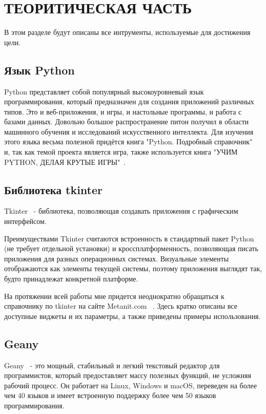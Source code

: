 \chapter{\label{ch:ch01}ТЕОРИТИЧЕСКАЯ ЧАСТЬ}


В этом разделе будут описаны все интрументы, используемые для достижения цели.

\section{\label{sec:ch01/sec01}Язык Python}
Python представляет собой популярный высокоуровневый язык программирования, который предназначен для создания приложений различных типов. Это и веб-приложения, и игры, и настольные программы, и работа с базами данных. Довольно большое распространение питон получил в области машинного обучения и исследований искусственного интеллекта.
Для изучения этого языка весьма полезной придётся книга "Python. Подробный справочник"~\cite{book-Python} и, так как темой проекта является игра, также используется книга "УЧИМ PYTHON, ДЕЛАЯ КРУТЫЕ ИГРЫ"~\cite{book-Python_2}.


\section{\label{sec:ch01/sec02}Библиотека tkinter}
Tkinter~\cite{Python-tkinter} - библиотека, позволяющая создавать приложения с графическим интерфейсом.

Преимуществами Tkinter считаются встроенность в стандартный пакет Python (не требует отдельной установки) и кроссплатформенность, позволяющая писать приложения для разных операционных системах. Визуальные элементы отображаются как элементы текущей системы, поэтому приложения выглядят так, будто принадлежат конкретной платформе.

На протяжении всей работы мне придется неоднократно обращаться к справочнику по tkinter на сайте Metanit.com ~\cite{tkinter-manual}. Здесь кратко описаны все доступные виджеты и их параметры, а также приведены примеры использования.

\section{\label{sec:ch01/sec02}Geany}
Geany~\cite{geany} - это мощный, стабильный и легкий текстовый редактор для программистов, который предоставляет массу полезных функций, не усложняя рабочий процесс. Он работает на Linux, Windows и macOS, переведен на более чем 40 языков и имеет встроенную поддержку более чем 50 языков программирования.

